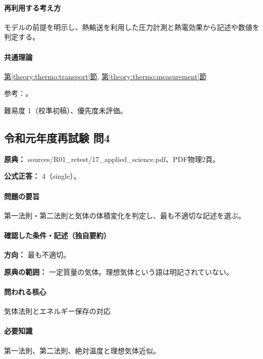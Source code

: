 \paragraph{再利用する考え方} モデルの前提を明示し、熱輸送を利用した圧力計測と熱電効果から記述や数値を判定する。

\paragraph{共通理論} \hyperref[theory:thermo:transport]{第\ref*{theory:thermo:transport}節}, \hyperref[theory:thermo:measurement]{第\ref*{theory:thermo:measurement}節}

\par 参考：\cite{ulvac_pirani,aist_metal_thermal}。

\par 難易度 1（校準初稿）、優先度未評価。

\subsection{令和元年度再試験 問4}
\label{q:r01-ret-applied-04}

\noindent\textbf{原典：} sources/R01\_retest/17\_applied\_science.pdf、PDF物理2頁。

\textbf{公式正答：} 4（single）。

\paragraph{問題の要旨} 第一法則・第二法則と気体の体積変化を判定し、最も不適切な記述を選ぶ。

\paragraph{確認した条件・記述（独自要約）}\mbox{}\par

\noindent\textbf{方向：} 最も不適切。\par

\noindent\textbf{原典の範囲：} 一定質量の気体。理想気体という語は明記されていない。\par

\paragraph{問われる核心} 気体法則とエネルギー保存の対応

\paragraph{必要知識} 第一法則、第二法則、絶対温度と理想気体近似。

